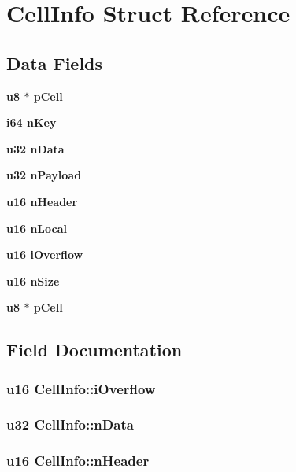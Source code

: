 \section{Cell\-Info Struct Reference}
\label{structCellInfo}
\subsection*{Data Fields}
\begin{CompactItemize}
\item 
\bf{u8} $\ast$ \bf{p\-Cell}
\item 
\bf{i64} \bf{n\-Key}
\item 
\bf{u32} \bf{n\-Data}
\item 
\bf{u32} \bf{n\-Payload}
\item 
\bf{u16} \bf{n\-Header}
\item 
\bf{u16} \bf{n\-Local}
\item 
\bf{u16} \bf{i\-Overflow}
\item 
\bf{u16} \bf{n\-Size}
\item 
\bf{u8} $\ast$ \bf{p\-Cell}
\end{CompactItemize}


\subsection{Field Documentation}
\subsubsection{\setlength{\rightskip}{0pt plus 5cm}\bf{u16} \bf{Cell\-Info::i\-Overflow}}\label{structCellInfo_52800659db90b522799ba7f15730c3f9}


\subsubsection{\setlength{\rightskip}{0pt plus 5cm}\bf{u32} \bf{Cell\-Info::n\-Data}}\label{structCellInfo_c9804bf2f2033c91b5502e3f5ba7a7da}


\subsubsection{\setlength{\rightskip}{0pt plus 5cm}\bf{u16} \bf{Cell\-Info::n\-Header}}\label{structCellInfo_c0257a91a77b1d273148dfe056d4d6f8}


